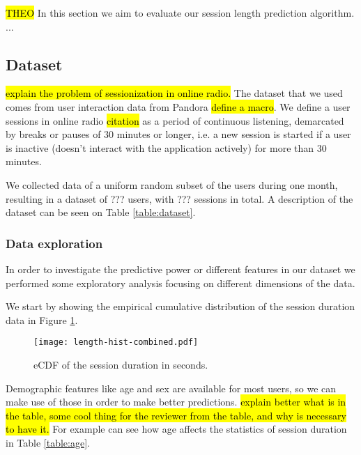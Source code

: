\hl{THEO}
In this section we aim to evaluate our session length prediction algorithm. ...

\subsection{Dataset}
\hl{explain the problem of sessionization in online radio.}
The dataset that we used comes from user interaction data from Pandora \hl{define a macro}.
We define a user sessions in online radio
\hl{citation} as a period of continuous listening, demarcated
by breaks or pauses of 30 minutes or longer, i.e. a new session is started 
if a user is inactive (doesn't interact with the application actively) for more than 30 minutes.


We collected data of a uniform random subset of the users during one month, resulting
in a dataset of ??? users, with ??? sessions in total. A description of the dataset can be seen
on Table \ref{table:dataset}. %

\subsubsection{Data exploration}


In order to investigate the predictive power or different features in our dataset we
performed some exploratory analysis focusing on different dimensions of the data.

We start by showing the empirical cumulative distribution of the session duration
data in Figure \ref{fig:eCDF_duration}.

\begin{figure}
	\texttt{[image: length-hist-combined.pdf]}
	\caption{eCDF of the session duration in seconds.}
	\label{fig:eCDF_duration}
\end{figure}

Demographic features like age and sex are available for most users, so we can make use of those
in order to make better predictions. \hl{explain better what is in the table, some cool thing for the reviewer from the table, and why is necessary to have it.} For example can see how age affects the statistics of session duration
in Table \ref{table:age}.

